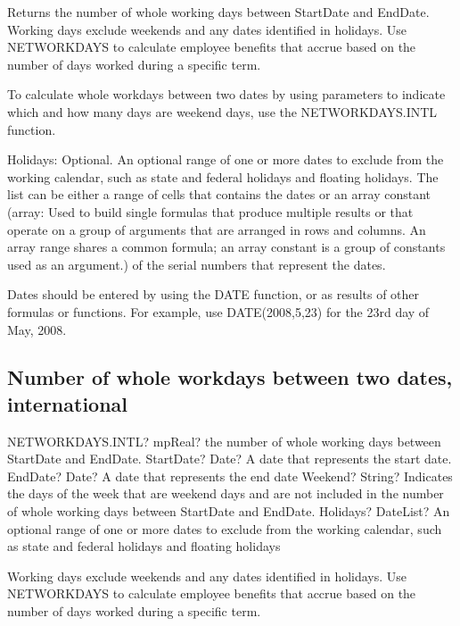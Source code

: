 \vspace{0.3cm}
Returns the number of whole working days between StartDate and EndDate. Working days exclude weekends and any dates identified in holidays. Use NETWORKDAYS to calculate employee benefits that accrue based on the number of days worked during a specific term.

To calculate whole workdays between two dates by using parameters to indicate which and how many days are weekend days, use the NETWORKDAYS.INTL function.

Holidays:  Optional. An optional range of one or more dates to exclude from the working calendar, such as state and federal holidays and floating holidays. The list can be either a range of cells that contains the dates or an array constant (array: Used to build single formulas that produce multiple results or that operate on a group of arguments that are arranged in rows and columns. An array range shares a common formula; an array constant is a group of constants used as an argument.) of the serial numbers that represent the dates.

Dates should be entered by using the DATE function, or as results of other formulas or functions. For example, use DATE(2008,5,23) for the 23rd day of May, 2008.



\subsection{Number of whole workdays between two dates, international}

\begin{mpFunctionsExtract}
	\mpWorksheetFunctionThreeNotImplemented
	{NETWORKDAYS.INTL? mpReal? the number of whole working days between StartDate and EndDate.}
	{StartDate? Date? A date that represents the start date.}
	{EndDate? Date? A date that represents the end date}
	{Weekend? String? Indicates the days of the week that are weekend days and are not included in the number of whole working days between StartDate and EndDate.}
	{Holidays? DateList?  An optional range of one or more dates to exclude from the working calendar, such as state and federal holidays and floating holidays}
\end{mpFunctionsExtract}

\vspace{0.3cm}
Working days exclude weekends and any dates identified in holidays. Use NETWORKDAYS to calculate employee benefits that accrue based on the number of days worked during a specific term.

